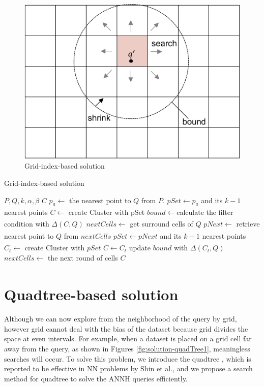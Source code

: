\documentclass[a4paper,11pt]{report}
\theoremstyle{mytheoremstyle}
\begin{document}
\begin{figure}
\includegraphics[width=\textwidth]{images/solution-grid.pdf}
\caption{Grid-index-based solution} \label{fig:solution-grid}
\end{figure}


\begin{algorithm}                      
\caption{Grid-index-based solution}         
\label{alg:grid}
\begin{algorithmic}[1]                  
\renewcommand{\algorithmicrequire}{\textbf{Input:}}
\renewcommand{\algorithmicensure}{\textbf{Output:}}
\REQUIRE $P,Q,k,\alpha, \beta$
\ENSURE $C$
\STATE $p_a \xleftarrow[]{}$ the nearest point to $Q$ from $P$.
\STATE $pSet \xleftarrow{} p_a$ and its $k-1$ nearest points
\STATE $C \xleftarrow[]{}$ create Cluster with pSet
\STATE $bound \xleftarrow[]{} $calculate the filter condition with $\Delta(C,Q)$
\STATE $nextCells \xleftarrow[]{} $ get surround cells of $Q$
\STATE $pNext \xleftarrow[]{}$ retrieve nearest point to $Q$ from $nextCells$
\STATE $pSet \xleftarrow[]{} pNext$ and its $k-1$ nearest points
\STATE $C_t \xleftarrow{}$ create Cluster with $pSet$
\STATE $C \xleftarrow{} C_t$
\STATE update $bound$ with $\Delta(C_t,Q)$
\ENDIF
\STATE $nextCells \xleftarrow[]{} $ the next round of cells
\ENDWHILE
\RETURN $C$
\end{algorithmic}
\end{algorithm}

\section{Quadtree-based solution}
Although we can now explore from the neighborhood of the query by grid, however grid cannot deal with the bias of the dataset because grid divides the space at even intervals. For example, when a dataset is placed on a grid cell far away from the query, as shown in Figures \ref{fig:solution-quadTree1}, meaningless searches will occur. To solve this problem, we introduce the quadtree \cite{finkel1974quad}, which is reported to be effective in NN problems by Shin et al.\cite{shin2019investigation}, and we propose a search method for quadtree to solve the ANNH queries efficiently.
\end{document}
